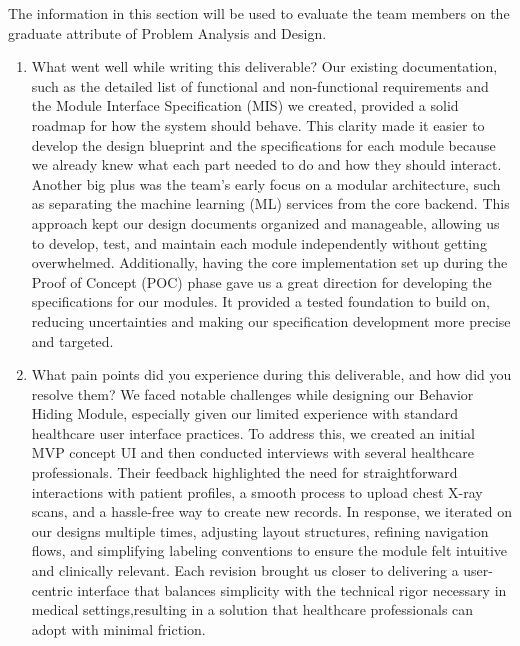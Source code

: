 \documentclass[12pt, titlepage]{article}
\begin{document}
The information in this section will be used to evaluate the team members on the
graduate attribute of Problem Analysis and Design.



\begin{enumerate}
  \item What went well while writing this deliverable? 
  \newline\newline 
  Our existing documentation, such as the detailed list of functional and non-functional requirements and the Module Interface Specification (MIS) we created, provided a solid roadmap for how the system should behave. This clarity made it easier to develop the design blueprint and the specifications for each module because we already knew what each part needed to do and how they should interact. Another big plus was the team’s early focus on a modular architecture, such as separating the machine learning (ML) services from the core backend. This approach kept our design documents organized and manageable, allowing us to develop, test, and maintain each module independently without getting overwhelmed. Additionally, having the core implementation set up during the Proof of Concept (POC) phase gave us a great direction for developing the specifications for our modules. It provided a tested foundation to build on, reducing uncertainties and making our specification development more precise and targeted.
  \item What pain points did you experience during this deliverable, and how
    did you resolve them?
    \newline\newline
    We faced notable challenges while designing our Behavior Hiding Module, especially given our limited experience with standard healthcare user interface practices. To address this, we created an initial MVP concept UI and then conducted interviews with several healthcare professionals. Their feedback highlighted the need for straightforward interactions with patient profiles, a smooth process to upload chest X-ray scans, and a hassle-free way to create new records. In response, we iterated on our designs multiple times, adjusting layout structures, refining navigation flows, and simplifying labeling conventions to ensure the module felt intuitive and clinically relevant. Each revision brought us closer to delivering a user-centric interface that balances simplicity with the technical rigor necessary in medical settings,resulting in a solution that healthcare professionals can adopt with minimal friction.

\end{enumerate}
\end{document}
